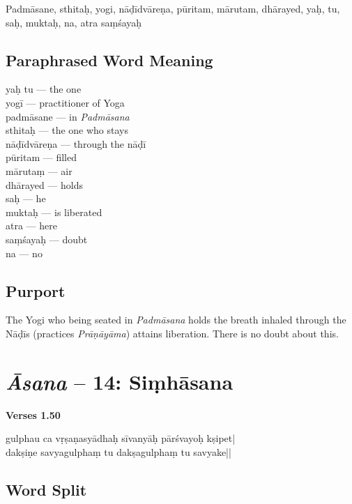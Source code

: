 Padmāsane, sthitaḥ, yogi, nāḍīdvāreṇa, pūritam, mārutam, dhārayed, yaḥ, tu, saḥ, muktaḥ, na, atra saṃśayaḥ

\subsection*{Paraphrased Word Meaning}


\begin{multicols}{2}
yaḥ tu --- the one   \\
yogī --- practitioner of Yoga \\
padmāsane ---  in \textit{Padmāsana} \\
sthitaḥ --- the one who stays  \\
nāḍīdvāreṇa ---  through the nāḍī \\
pūritam --- filled  \\
mārutaṃ ---  air  \\
dhārayed ---  holds  \\
saḥ ---  he  \\
muktaḥ --- is liberated \\
atra --- here  \\
saṃśayaḥ --- doubt\\
na ---  no
\end{multicols}

\subsection*{Purport}

The Yogi who being seated in \textit{Padmāsana} holds the breath inhaled through the Nāḍīs (practices \textit{Prāṇāyāma}) attains liberation. There is no doubt about this.
\newpage

\section*{\textit{Āsana} -- 14: Siṃhāsana}


\noindent \textbf{Verses 1.50}

\begin{shloka}
gulphau ca vṛṣaṇasyādhaḥ sīvanyāḥ pārśvayoḥ kṣipet|\\
dakṣiṇe savyagulphaṃ tu dakṣagulphaṃ tu savyake||
\end{shloka}

\subsection*{Word Split}

